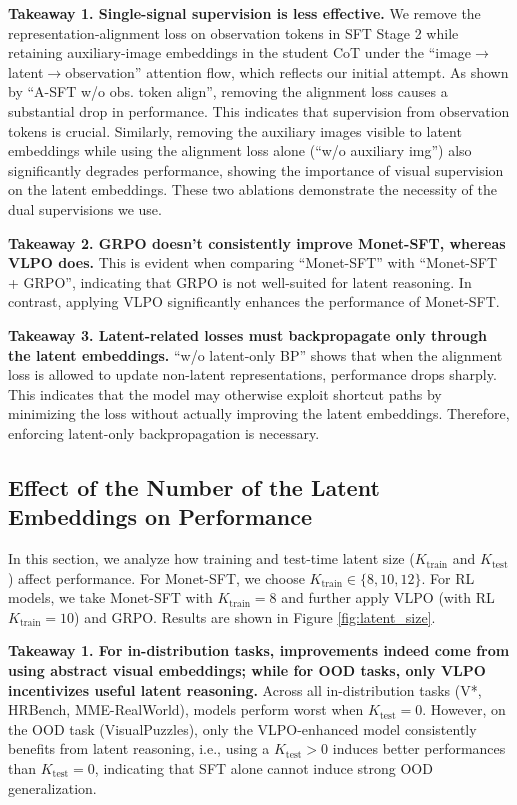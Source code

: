 \textbf{Takeaway 1. Single-signal supervision is less effective.} We remove the representation-alignment loss on observation tokens in SFT Stage 2 while retaining auxiliary-image embeddings in the student CoT under the ``image$\rightarrow$latent$\rightarrow$observation'' attention flow, which reflects our initial attempt. As shown by ``A-SFT w/o obs. token align'', removing the alignment loss causes a substantial drop in performance. This indicates that supervision from observation tokens is crucial. Similarly, removing the auxiliary images visible to latent embeddings while using the alignment loss alone (``w/o auxiliary img'') also significantly degrades performance, showing the importance of visual supervision on the latent embeddings. These two ablations demonstrate the necessity of the dual supervisions we use.

\textbf{Takeaway 2. GRPO doesn't consistently improve Monet-SFT, whereas VLPO does.} This is evident when comparing ``Monet-SFT'' with ``Monet-SFT + GRPO'', indicating that GRPO is not well-suited for latent reasoning. In contrast, applying VLPO significantly enhances the performance of Monet-SFT.

\textbf{Takeaway 3. Latent-related losses must backpropagate only through the latent embeddings.} ``w/o latent-only BP'' shows that when the alignment loss is allowed to update non-latent representations, performance drops sharply. This indicates that the model may otherwise exploit shortcut paths by minimizing the loss without actually improving the latent embeddings. Therefore, enforcing latent-only backpropagation is necessary.





\subsection{Effect of the Number of the Latent Embeddings on Performance}
\label{sec:latent_size}
In this section, we analyze how training and test-time latent size ($K_{\text{train}}$ and $K_{\text{test}}$) affect performance. For Monet-SFT, we choose $K_{\text{train}}\in\{8, 10, 12\}$. For RL models, we take Monet-SFT with $K_{\text{train}}=8$ and further apply VLPO (with RL $K_{\text{train}}=10$) and GRPO. Results are shown in Figure \ref{fig:latent_size}.

\textbf{Takeaway 1. For in-distribution tasks, improvements indeed come from using abstract visual embeddings; while for OOD tasks, only VLPO incentivizes useful latent reasoning.} Across all in-distribution tasks (V*, HRBench, MME-RealWorld), models perform worst when $K_{\text{test}}=0$. However, on the OOD task (VisualPuzzles), only the VLPO-enhanced model consistently benefits from latent reasoning, i.e., using a $K_{\text{test}}>0$ induces better performances than $K_{\text{test}}=0$, indicating that SFT alone cannot induce strong OOD generalization.

